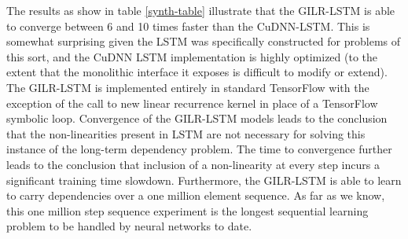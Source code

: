\documentclass{article}
\begin{document}
The results as show in table \ref{synth-table} illustrate that the GILR-LSTM is able to converge between 6 and 10
times faster than the CuDNN-LSTM. This is somewhat surprising
given the LSTM was specifically constructed for problems of this sort, and the
CuDNN LSTM implementation is highly optimized (to the extent that
the monolithic interface it exposes is difficult to modify or extend). The
GILR-LSTM is implemented entirely in standard TensorFlow with the exception of
the call to new linear recurrence kernel in place of a TensorFlow symbolic
loop.
Convergence of the GILR-LSTM models
leads to the conclusion that the non-linearities present in LSTM are
not necessary for solving this instance of the long-term dependency problem.
The time to convergence further leads to the conclusion that inclusion of a
non-linearity at every step incurs a significant training time slowdown.
Furthermore, the GILR-LSTM is able to learn to carry dependencies over a one
million element sequence. As far as we know, this one million step sequence
experiment is the longest sequential learning problem to be handled by neural
networks to date.
\end{document}
